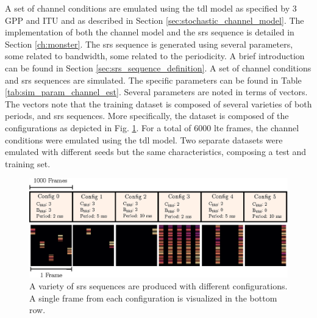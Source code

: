 A set of channel conditions are emulated using the \gls{tdl} model as specified by $3$GPP and ITU \cite{3GPP38901, ITU2412} and as described in Section \ref{sec:stochastic_channel_model}. The implementation of both the channel model and the \gls{srs} sequence is detailed in Section \ref{ch:monster}. The \gls{srs} sequence is generated using several parameters, some related to bandwidth, some related to the periodicity. A brief introduction can be found in Section \ref{sec:srs_sequence_definition}. A set of channel conditions and \gls{srs} sequences are simulated. The specific parameters can be found in Table \ref{tab:sim_param_channel_est}. Several parameters are noted in terms of vectors. The vectors note that the training dataset is composed of several varieties of both periods, and \gls{srs} sequences. More specifically, the dataset is composed of the configurations as depicted in Fig. \ref{fig:data_channel_estimation}. For a total of $6000$ \gls{lte} frames, the channel conditions were emulated using the \gls{tdl} model. Two separate datasets were emulated with different seeds but the same characteristics, composing a test and training set. 

\begin{figure}
    \centering
    \includegraphics{chapters/part_uplink/figures/data_channel_estimation.eps}
    \caption{A variety of \gls{srs} sequences are produced with different configurations. A single frame from each configuration is visualized in the bottom row. }
    \label{fig:data_channel_estimation}
\end{figure}



